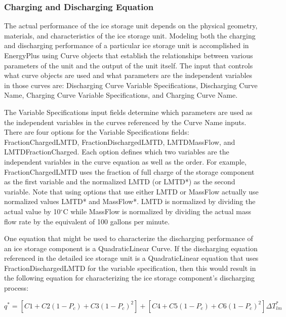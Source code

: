 \subsubsection{Charging and Discharging Equation}\label{charging-and-discharging-equation}

The actual performance of the ice storage unit depends on the physical geometry, materials, and characteristics of the ice storage unit. Modeling both the charging and discharging performance of a particular ice storage unit is accomplished in EnergyPlus using Curve objects that establish the relationships between various parameters of the unit and the output of the unit itself. The input that controls what curve objects are used and what parameters are the independent variables in those curves are: Discharging Curve Variable Specifications, Discharging Curve Name, Charging Curve Variable Specifications, and Charging Curve Name.

The Variable Specifications input fields determine which parameters are used as the independent variables in the curves referenced by the Curve Name inputs.  There are four options for the Variable Specifications fields: FractionChargedLMTD, FractionDischargedLMTD, LMTDMassFlow, and LMTDFractionCharged.  Each option defines which two variables are the independent variables in the curve equation as well as the order.  For example, FractionChargedLMTD uses the fraction of full charge of the storage component as the first variable and the normalized LMTD (or LMTD*) as the second variable.  Note that using options that use either LMTD or MassFlow actually use normalized values LMTD* and MassFlow*.  LMTD is normalized by dividing the actual value by 10\(^{\circ}\)C while MassFlow is normalized by dividing the actual mass flow rate by the equivalent of 100 gallons per minute.

One equation that might be used to characterize the discharging performance of an ice storage component is a QuadraticLinear Curve.  If the discharging equation referenced in the detailed ice storage unit is a QuadraticLinear equation that uses FractionDischargedLMTD for the variable specification, then this would result in the following equation for characterizing the ice storage component's discharging process:

\begin{equation}
{q^*} = \left[ {C1 + C2\left( {1 - {P_c}} \right) + C3{{\left( {1 - {P_c}} \right)}^2}} \right] + \left[ {C4 + C5\left( {1 - {P_c}} \right) + C6{{\left( {1 - {P_c}} \right)}^2}} \right]\Delta T_{lm}^*
\end{equation}

